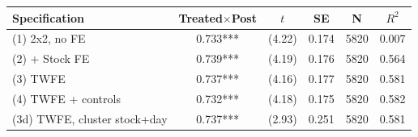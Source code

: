 \begin{tabular}{lccccc}
\toprule
Specification & Treated$\times$Post & $t$ & SE & N & $R^2$ \\
\midrule
(1) 2x2, no FE & 0.733*** & (4.22) & 0.174 & 5820 & 0.007 \\
(2) + Stock FE & 0.739*** & (4.19) & 0.176 & 5820 & 0.564 \\
(3) TWFE & 0.737*** & (4.16) & 0.177 & 5820 & 0.581 \\
(4) TWFE + controls & 0.732*** & (4.18) & 0.175 & 5820 & 0.582 \\
(3d) TWFE, cluster stock+day & 0.737*** & (2.93) & 0.251 & 5820 & 0.581 \\
\bottomrule
\end{tabular}